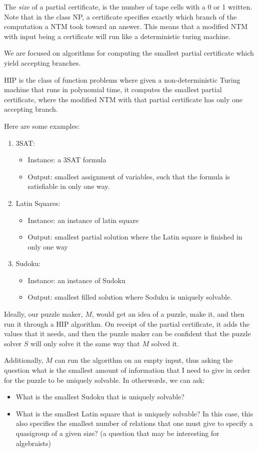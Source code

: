 \documentclass[runningheads,a4paper]{llncs}
\begin{document}
The \emph{size} of a partial certificate, is the number of tape cells with a 0 or 1 written. Note that in the class NP, a certificate specifies exactly which branch of the computation a NTM took toward an answer. This means that a modified NTM with input being a certificate will run like a deterministic turing machine. 

We are focused on algorithms for computing the smallest partial certificate which yield accepting branches.

\begin{definition}
HIP is the class of function problems where given a non-deterministic Turing machine that runs in polynomial time, it computes the smallest partial certificate, where the modified NTM with that partial certificate has only one accepting branch.
\end{definition}

Here are some examples:
\begin{enumerate}
\item 3SAT: \begin{itemize}
	\item Instance: a 3SAT formula
	\item Output: smallest assignment of variables, such that the formula is satisfiable in only one way.
		\end{itemize}
\item Latin Squares: \begin{itemize}
				\item Instance: an instance of latin square
				\item Output: smallest partial solution where the Latin square is finished in only one way
				\end{itemize}
\item Sudoku: \begin{itemize}
				\item Instance: an instance of Sudoku
				\item Output: smallest filled solution where Soduku is uniquely solvable.
\end{itemize}
\end{enumerate}

Ideally, our puzzle maker, $M$, would get an idea of a puzzle, make it, and then run it through a HIP algorithm. On receipt of the partial certificate, it adds the values that it needs, and then the puzzle maker can be confident that the puzzle solver $S$ will only solve it the same way that $M$ solved it.

Additionally, $M$ can run the algorithm on an empty input, thus asking the question what is the smallest amount of information that I need to give in order for the puzzle to be uniquely solvable. In otherwords, we can ask:
\begin{itemize}
\item What is the smallest Sudoku that is uniquely solvable?
\item What is the smallest Latin square that is uniquely solvable? In this case, this also specifies the smallest number of relations that one must give to specify a quasigroup of a given size? (a question that may be interesting for algebraists)
\end{itemize}
\end{document}

